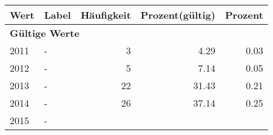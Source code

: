      \begin{longtable}{lXrrr}
     \toprule
     \textbf{Wert} & \textbf{Label} & \textbf{Häufigkeit} & \textbf{Prozent(gültig)} & \textbf{Prozent} \\
     \endhead
     \midrule
     \multicolumn{5}{l}{\textbf{Gültige Werte}}\\

     2011 &
     \multicolumn{1}{X}{ -  } &


       \num{3} &
       \num[round-mode=places,round-precision=2]{4.29} &
         \num[round-mode=places,round-precision=2]{0.03} \\

     2012 &
     \multicolumn{1}{X}{ -  } &


       \num{5} &
       \num[round-mode=places,round-precision=2]{7.14} &
         \num[round-mode=places,round-precision=2]{0.05} \\

     2013 &
     \multicolumn{1}{X}{ -  } &


       \num{22} &
       \num[round-mode=places,round-precision=2]{31.43} &
         \num[round-mode=places,round-precision=2]{0.21} \\

     2014 &
     \multicolumn{1}{X}{ -  } &


       \num{26} &
       \num[round-mode=places,round-precision=2]{37.14} &
         \num[round-mode=places,round-precision=2]{0.25} \\

     2015 &
     \multicolumn{1}{X}{ -  } &



\end{longtable}
